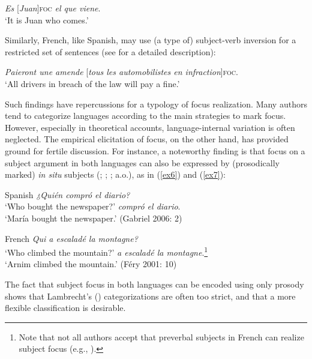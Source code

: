  \ea \label{ex4}
 \textit{Es} {[\textit{Juan}]\textsc{foc}} \normalsize \textit{el que viene}.\\
 `It is Juan who comes.' \hfill \parencite[8]{feldhausen2015oraciones}

 \z 
 

Similarly, French, like Spanish, may use (a type of) subject-verb inversion for a restricted set of sentences (see \cite{Lahousse2011} for a detailed description):

 \ea \label{ex5}
 \textit{Paieront une amende} {[\textit{tous les automobilistes en infraction}}]\textsc{foc}\normalsize.\\
 `All drivers in breach of the law will pay a fine.'   \hfill  \parencite[109]{marchello2008evolution}

 \z
 
Such findings have repercussions for a typology of focus realization. Many authors tend to categorize languages according to the main strategies to mark focus. However, especially in theoretical accounts, language-internal variation is often neglected.
The empirical elicitation of focus, on the other hand, has provided ground for fertile discussion. For instance, a noteworthy finding is that focus on a subject argument in both languages can also be expressed by (prosodically marked) \textit{in situ} subjects (\cite{gabriel2007fokus}; \cite{fery2001focus}; \cite{destruel2012french}; a.o.), as in (\ref{ex6}) and (\ref{ex7}):

 \ea \label{ex6} Spanish
 \ea \textit{¿Quién compró el diario?}\\
 `Who bought the newspaper?'
  \normalsize \textit{compró el diario}.\\
 `María bought the newspaper.' \hfill (Gabriel 2006: 2)   
  \z \z

 \ea \label{ex7} French
 \ea \textit{Qui a escaladé la montagne?}\\
 `Who climbed the mountain?'
  \normalsize \textit{a escaladé la montagne}.\footnote{Note that not all authors accept that preverbal subjects in French can realize subject focus (e.g., \cite{lambrecht1996information}).}\\
 `Arnim climbed the mountain.'  \hfill (Féry 2001: 10)   
\z \z
 

The fact that subject focus in both languages can be encoded using only prosody shows that Lambrecht's (\citeyear{lambrecht1996information}) categorizations are often too strict, and that a more flexible classification is desirable.

